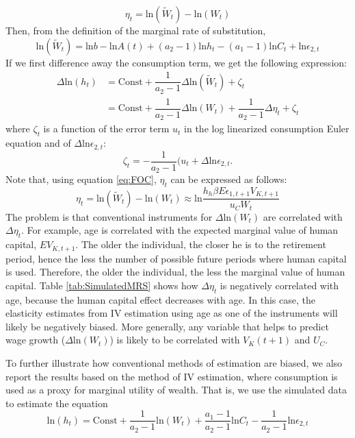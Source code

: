 \documentclass[\econtexRoot/ImaiKeane]{subfiles}
\begin{document}
      $$ \eta_t = \text{ln}(\tilde{W}_t) - \text{ln}(W_t) $$
    Then, from the definition of the marginal rate of substitution,
    $$  \text{ln}(\tilde{W}_t) =  \text{ln} b -  \text{ln} A(t) + (a_2 - 1)  \text{ln} h_t - (a_1 - 1)  \text{ln} C_t +  \text{ln} \epsilon_{2,t}$$
    If we first difference away the consumption term, we get the following expression:
    \begin{equation*}
      \begin{split}
        \Delta  \text{ln}(h_t) & = \text{Const} + \dfrac{1}{a_2 - 1} \Delta  \text{ln} (\tilde{W}_t) + \zeta_t \\
        & =  \text{Const} + \dfrac{1}{a_2 - 1} \Delta  \text{ln} (W_t) + \dfrac{1}{a_2 - 1} \Delta \eta_t + \zeta_t
           \end{split}
          \end{equation*}
        where $\zeta_t$ is a function of the error term $u_t$ in the log linearized consumption Euler equation and of $\Delta \text{ln} \epsilon_{2,t}$:
        $$ \zeta_t = -\dfrac{1}{a_2-1}(u_t + \Delta \text{ln} \epsilon_{2,t}.$$
        Note that, using equation \eqref{eq:FOC}, $\eta_t$ can be expressed as follows:
        $$ \eta_t = \text{ln} (\tilde{W}_t) -\text{ln} (W_t) \approx \text{ln} \dfrac{h_h \beta E \epsilon_{1,t+1} V_{K,t+1}}{u_C W_t}$$
        The problem is that conventional instruments for $\Delta \text{ln}(W_t)$ are correlated with $\Delta \eta_t$. For example, age is correlated with the expected marginal value of human capital, $E V_{K,t+1}$. The older the individual, the closer he is to the retirement period, hence the less the number of possible future periods where human capital is used. Therefore, the older the individual, the less the marginal value of human capital. Table \ref{tab:SimulatedMRS} shows how $\Delta \eta_t$ is negatively correlated with age, because the human capital effect decreases with age. In this case, the elasticity estimates from IV estimation using age as one of the instruments will likely be negatively biased. More generally, any variable that helps to predict wage growth ($\Delta \text{ln}(W_t)$) is likely to be correlated with $V_K (t + 1)$ and $U_C$. \par
        To further illustrate how conventional methods of estimation are biased, we also report the results based on the \cite{Altonji1986-zf} method of IV estimation, where consumption is used as a proxy for marginal utility of wealth. That is, we use the simulated data to estimate the equation
        $$ \text{ln}(h_t) = \text{Const} + \dfrac{1}{a_2 - 1} \text{ln}(W_t) + \dfrac{a_1 -1}{a_2 - 1} \text{ln} C_t - \dfrac{1}{a_2 - 1} \text{ln} \epsilon_{2,t}$$
\end{document}
